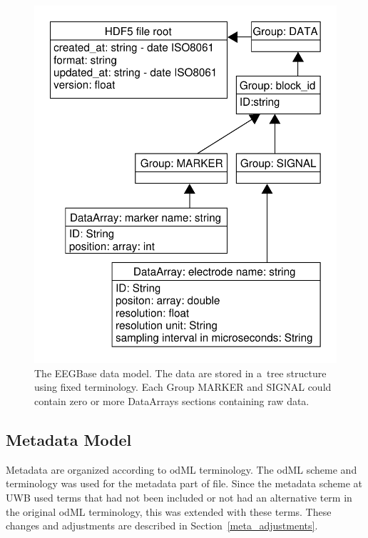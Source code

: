 \documentclass[conference]{IEEEtran}
\begin{document}
\begin{figure}
	\begin{center}
		\includegraphics[scale=0.51]{obrazky/data.pdf}
		\caption{The EEGBase data model. The data are stored in a~tree structure using fixed terminology. Each Group MARKER and SIGNAL could contain zero or more DataArrays sections containing raw data.}
		\label{format_scheme}
	\end{center}
\end{figure}


\subsection{Metadata Model}
\label{odml_section}
Metadata are organized according to odML terminology. The odML scheme and terminology was used for the metadata part of file. Since the metadata scheme at UWB used terms that had not been included or not had an alternative term in the original odML terminology, this was extended with these terms. These changes and adjustments are described in Section~\ref{meta_adjustments}.
\end{document}
